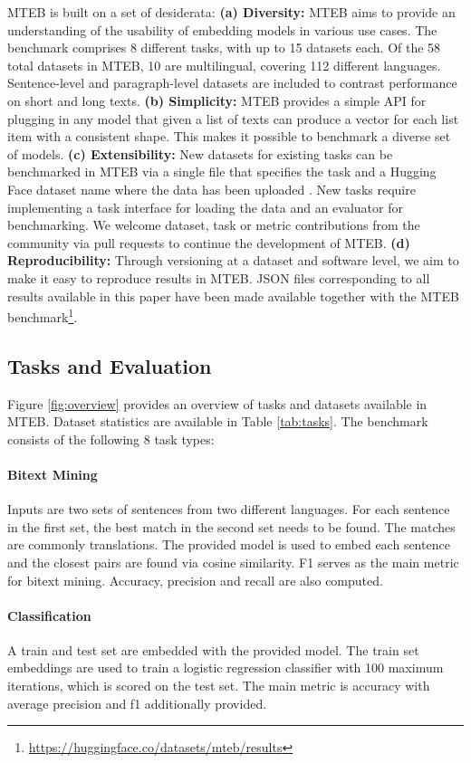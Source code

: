 \documentclass[11pt]{article}
\begin{document}
MTEB is built on a set of desiderata: \textbf{(a) Diversity:} MTEB aims to provide an understanding of the usability of embedding models in various use cases. The benchmark comprises 8 different tasks, with up to 15 datasets each. Of the 58 total datasets in MTEB, 10 are multilingual, covering 112 different languages. Sentence-level and paragraph-level datasets are included to contrast performance on short and long texts. \textbf{(b) Simplicity:} MTEB provides a simple API for plugging in any model that given a list of texts can produce a vector for each list item with a consistent shape. This makes it possible to benchmark a diverse set of models. \textbf{(c) Extensibility:} New datasets for existing tasks can be benchmarked in MTEB via a single file that specifies the task and a Hugging Face dataset name where the data has been uploaded \cite{lhoest2021datasets}. New tasks require implementing a task interface for loading the data and an evaluator for benchmarking. We welcome dataset, task or metric contributions from the community via pull requests to continue the development of MTEB. \textbf{(d) Reproducibility:} Through versioning at a dataset and software level, we aim to make it easy to reproduce results in MTEB. JSON files corresponding to all results available in this paper have been made available together with the MTEB benchmark\footnote{\url{https://huggingface.co/datasets/mteb/results}}.

\subsection{Tasks and Evaluation}
\label{sec:taskeval}

Figure \ref{fig:overview} provides an overview of tasks and datasets available in MTEB. Dataset statistics are available in Table \ref{tab:tasks}. The benchmark consists of the following 8 task types:

\paragraph{Bitext Mining} Inputs are two sets of sentences from two different languages. For each sentence in the first set, the best match in the second set needs to be found. The matches are commonly translations. The provided model is used to embed each sentence and the closest pairs are found via cosine similarity. F1 serves as the main metric for bitext mining. Accuracy, precision and recall are also computed.
    
\paragraph{Classification} A train and test set are embedded with the provided model. The train set embeddings are used to train a logistic regression classifier with 100 maximum iterations, which is scored on the test set. The main metric is accuracy with average precision and f1 additionally provided.
\end{document}
